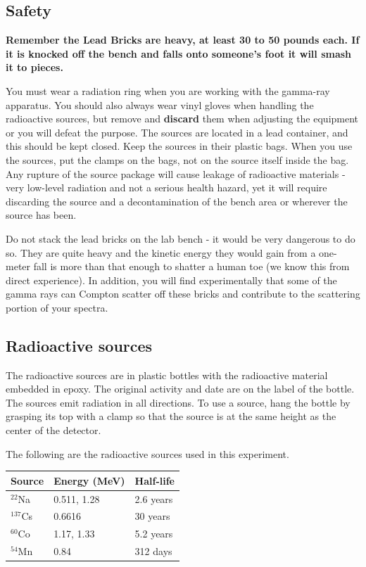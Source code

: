 \documentclass{../lab}
\begin{document}
\subsection{Safety}

\textbf{Remember the Lead Bricks are heavy, at least 30 to 50 pounds each. If it is knocked off the bench and falls onto someone's foot it will smash it to pieces.}

You must wear a radiation ring when you are working with the gamma-ray apparatus. You should also always wear vinyl gloves when handling the radioactive sources, but remove and \textbf{discard} them when adjusting the equipment or you will defeat the purpose. The sources are located in a lead container, and this should be kept closed. Keep the sources in their plastic bags. When you use the sources, put the clamps on the bags, not on the source itself inside the bag. Any rupture of the source package will cause leakage of radioactive materials - very low-level radiation and not a serious health hazard, yet it will require discarding the source and a decontamination of the bench area or wherever the source has been.

Do not stack the lead bricks on the lab bench - it would be very dangerous to do so. They are quite heavy and the kinetic energy they would gain from a one-meter fall is more than that enough to shatter a human toe (we know this from direct experience). In addition, you will find experimentally that some of the gamma rays can Compton scatter off these bricks and contribute to the scattering portion of your spectra.

\subsection{Radioactive sources}

The radioactive sources are in plastic bottles with the radioactive material embedded in epoxy. The original activity and date are on the label of the bottle. The sources emit radiation in all directions. To use a source, hang the bottle by grasping its top with a clamp so that the source is at the same height as the center of the detector.

The following are the radioactive sources used in this experiment.

\begin{center}
    \begin{tabular}{l|l|l}
        Source     & Energy (MeV) & Half-life \\\hline
        $^{22}$Na  &  0.511, 1.28 & 2.6 years \\\hline
        $^{137}$Cs &  0.6616      & 30 years  \\\hline
        $^{60}$Co  &  1.17, 1.33  & 5.2 years \\\hline
        $^{54}$Mn  &  0.84        & 312 days
    \end{tabular}
\end{center}
\end{document}
